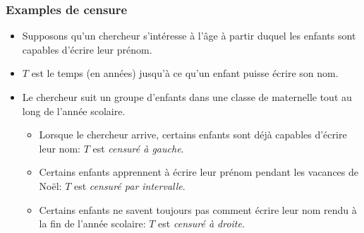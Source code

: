\documentclass{beamer}
\begin{document}
\begin{frame}
\frametitle{Examples de censure}
\begin{itemize} \item Supposons qu'un chercheur s'intéresse à l'âge à partir duquel les enfants sont capables d'écrire leur prénom. 
\item $T$ est le temps (en années) jusqu'à ce qu'un enfant puisse écrire son nom. 
\item Le chercheur suit un groupe d'enfants dans une classe de maternelle tout au long de l'année scolaire. 
\begin{itemize} \item Lorsque le chercheur arrive, certains enfants sont déjà capables d'écrire leur nom: $T$ est \emph{censuré à gauche}. 
\item Certains enfants apprennent à écrire leur prénom pendant les vacances de Noël: $T$ est \emph{censuré par intervalle}. \item Certains enfants ne savent toujours pas comment écrire leur nom rendu à la fin de l'année scolaire:  $T$ est \emph{censuré à droite}.
\end{itemize}
\end{itemize}
\end{frame}
\end{document}
